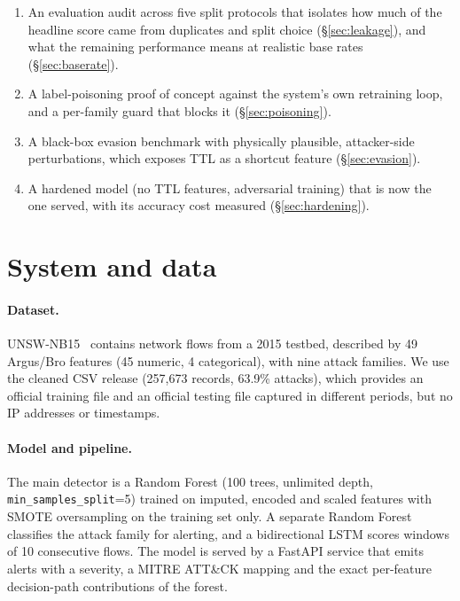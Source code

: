 \documentclass[11pt,a4paper]{article}
\newcommand{\code}[1]{\texttt{#1}}
\begin{document}
\begin{enumerate}
  \item An evaluation audit across five split protocols that isolates how
        much of the headline score came from duplicates and split choice
        (\S\ref{sec:leakage}), and what the remaining performance means at
        realistic base rates (\S\ref{sec:baserate}).
  \item A label-poisoning proof of concept against the system's own
        retraining loop, and a per-family guard that blocks it
        (\S\ref{sec:poisoning}).
  \item A black-box evasion benchmark with physically plausible,
        attacker-side perturbations, which exposes TTL as a shortcut
        feature (\S\ref{sec:evasion}).
  \item A hardened model (no TTL features, adversarial training) that is
        now the one served, with its accuracy cost measured
        (\S\ref{sec:hardening}).
\end{enumerate}

\section{System and data}

\paragraph{Dataset.} UNSW-NB15~\cite{moustafa2015} contains network flows
from a 2015 testbed, described by 49 Argus/Bro features (45 numeric,
4 categorical), with nine attack families. We use the cleaned CSV release
(257,673 records, 63.9\% attacks), which provides an official training file
and an official testing file captured in different periods, but no IP
addresses or timestamps.

\paragraph{Model and pipeline.} The main detector is a Random Forest
(100 trees, unlimited depth, \code{min\_samples\_split}=5) trained on
imputed, encoded and scaled features with SMOTE oversampling on the training
set only. A separate Random Forest classifies the attack family for
alerting, and a bidirectional LSTM scores windows of 10 consecutive flows.
The model is served by a FastAPI service that emits alerts with a severity,
a MITRE ATT\&CK mapping and the exact per-feature decision-path
contributions of the forest.
\end{document}
